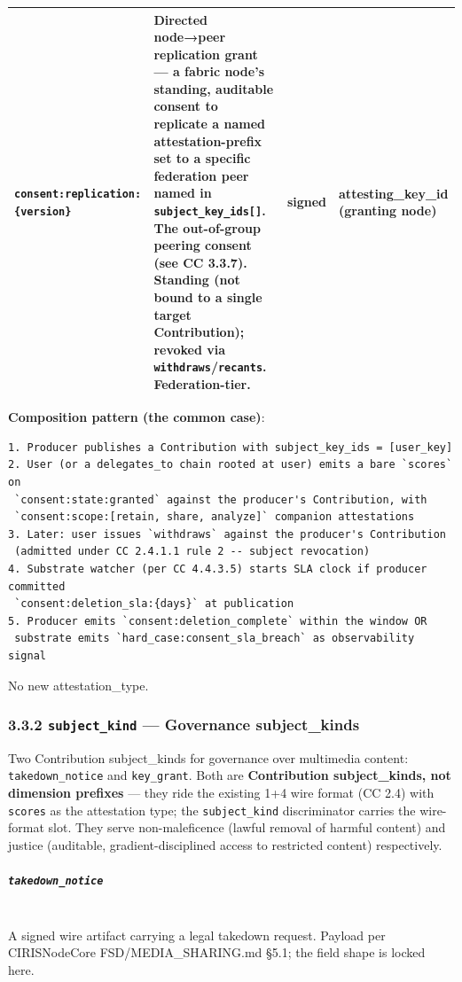 \documentclass[11pt]{article}
\begin{document}
{\begin{longtable}{|p{4.0cm}|p{4.0cm}|p{4.0cm}|p{4.0cm}|}
\texttt{consent:replication:\{version\}} & \textbf{Directed node→peer replication grant} — a fabric node's standing, auditable consent to replicate a named attestation-prefix set to a specific federation \textbf{peer} named in \texttt{subject\_key\_ids[]}. The out-of-group peering consent (see CC 3.3.7). Standing (not bound to a single target Contribution); revoked via \texttt{withdraws}/\texttt{recants}. Federation-tier. & signed & attesting\_key\_id (granting node) \\ \hline
\end{longtable}}


\textbf{Composition pattern (the common case)}:


\begin{lstlisting}
1. Producer publishes a Contribution with subject_key_ids = [user_key]
2. User (or a delegates_to chain rooted at user) emits a bare `scores` on
 `consent:state:granted` against the producer's Contribution, with
 `consent:scope:[retain, share, analyze]` companion attestations
3. Later: user issues `withdraws` against the producer's Contribution
 (admitted under CC 2.4.1.1 rule 2 -- subject revocation)
4. Substrate watcher (per CC 4.4.3.5) starts SLA clock if producer committed
 `consent:deletion_sla:{days}` at publication
5. Producer emits `consent:deletion_complete` within the window OR
 substrate emits `hard_case:consent_sla_breach` as observability signal
\end{lstlisting}

No new attestation\_type.


\subsubsection*{3.3.2 \texttt{subject\_kind} — Governance subject\_kinds}


Two Contribution subject\_kinds for governance over multimedia content: \texttt{takedown\_notice} and \texttt{key\_grant}. Both are \textbf{Contribution subject\_kinds, not dimension prefixes} — they ride the existing 1+4 wire format (CC 2.4) with \texttt{scores} as the attestation type; the \texttt{subject\_kind} discriminator carries the wire-format slot. They serve non-maleficence (lawful removal of harmful content) and justice (auditable, gradient-disciplined access to restricted content) respectively.


\subparagraph{\texttt{takedown\_notice}}\mbox{}\\


A signed wire artifact carrying a legal takedown request. Payload per CIRISNodeCore FSD/MEDIA\_SHARING.md §5.1; the field shape is locked here.
\end{document}
